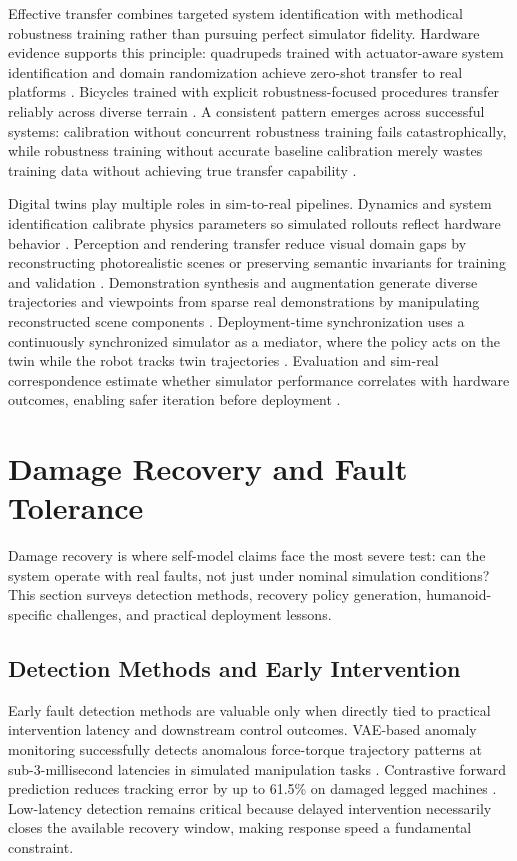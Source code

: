\documentclass[12pt,a4paper,oneside]{report}
\begin{document}
Effective transfer combines targeted system identification with methodical robustness training rather than pursuing perfect simulator fidelity. Hardware evidence supports this principle: quadrupeds trained with actuator-aware system identification and domain randomization achieve zero-shot transfer to real platforms \cite{tan2018simtoreal}. Bicycles trained with explicit robustness-focused procedures transfer reliably across diverse terrain \cite{liu2024cyclerl}. A consistent pattern emerges across successful systems: calibration without concurrent robustness training fails catastrophically, while robustness training without accurate baseline calibration merely wastes training data without achieving true transfer capability \cite{tan2018simtoreal, aljalbout2026realitygap}.

Digital twins play multiple roles in sim-to-real pipelines. Dynamics and system identification calibrate physics parameters so simulated rollouts reflect hardware behavior \cite{heiden2022inferring, lou2026drex}. Perception and rendering transfer reduce visual domain gaps by reconstructing photorealistic scenes or preserving semantic invariants for training and validation \cite{qureshi2025splatsim, tang2025semantic}. Demonstration synthesis and augmentation generate diverse trajectories and viewpoints from sparse real demonstrations by manipulating reconstructed scene components \cite{yang2025robosplat, yu2025real2render2real}. Deployment-time synchronization uses a continuously synchronized simulator as a mediator, where the policy acts on the twin while the robot tracks twin trajectories \cite{abou2024realissim}. Evaluation and sim-real correspondence estimate whether simulator performance correlates with hardware outcomes, enabling safer iteration before deployment \cite{jain2025polaris, li2024simpler}.

\section{Damage Recovery and Fault Tolerance}
\label{sec:damage_recovery_lit}

Damage recovery is where self-model claims face the most severe test: can the system operate with real faults, not just under nominal simulation conditions? This section surveys detection methods, recovery policy generation, humanoid-specific challenges, and practical deployment lessons.

\subsection{Detection Methods and Early Intervention}
Early fault detection methods are valuable only when directly tied to practical intervention latency and downstream control outcomes. VAE-based anomaly monitoring successfully detects anomalous force-torque trajectory patterns at sub-3-millisecond latencies in simulated manipulation tasks \cite{grambow2026anomaly}. Contrastive forward prediction reduces tracking error by up to 61.5\% on damaged legged machines \cite{fu2025contrastive}. Low-latency detection remains critical because delayed intervention necessarily closes the available recovery window, making response speed a fundamental constraint.
\end{document}
